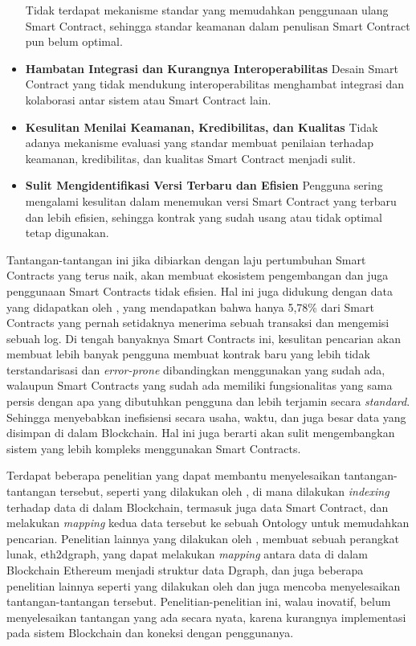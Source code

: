 \begin{itemize}
	      Tidak terdapat mekanisme standar yang memudahkan penggunaan ulang Smart Contract, sehingga standar keamanan dalam penulisan Smart Contract pun belum optimal.
	\item \textbf{Hambatan Integrasi dan Kurangnya Interoperabilitas} \newline
	      Desain Smart Contract yang tidak mendukung interoperabilitas menghambat integrasi dan kolaborasi antar sistem atau Smart Contract lain.
	\item \textbf{Kesulitan Menilai Keamanan, Kredibilitas, dan Kualitas} \newline
	      Tidak adanya mekanisme evaluasi yang standar membuat penilaian terhadap keamanan, kredibilitas, dan kualitas Smart Contract menjadi sulit.
	\item \textbf{Sulit Mengidentifikasi Versi Terbaru dan Efisien} \newline
	      Pengguna sering mengalami kesulitan dalam menemukan versi Smart Contract yang terbaru dan lebih efisien, sehingga kontrak yang sudah usang atau tidak optimal tetap digunakan.
\end{itemize}

Tantangan-tantangan ini jika dibiarkan dengan laju pertumbuhan Smart Contracts yang terus naik, akan membuat ekosistem pengembangan dan juga penggunaan Smart Contracts tidak efisien. Hal ini juga didukung dengan data yang didapatkan oleh \cite{aimar2023extraction}, yang mendapatkan bahwa hanya 5,78\% dari Smart Contracts yang pernah setidaknya menerima sebuah transaksi dan mengemisi sebuah log. Di tengah banyaknya Smart Contracts ini, kesulitan pencarian akan membuat lebih banyak pengguna membuat kontrak baru yang lebih tidak terstandarisasi dan \textit{error-prone} dibandingkan menggunakan yang sudah ada, walaupun Smart Contracts yang sudah ada memiliki fungsionalitas yang sama persis dengan apa yang dibutuhkan pengguna dan lebih terjamin secara \textit{standard}. Sehingga menyebabkan inefisiensi secara usaha, waktu, dan juga besar data yang disimpan di dalam Blockchain. Hal ini juga berarti akan sulit mengembangkan sistem yang lebih kompleks menggunakan Smart Contracts.

Terdapat beberapa penelitian yang dapat membantu menyelesaikan tantangan-tantangan tersebut, seperti yang dilakukan oleh \cite{third2017linked}, di mana dilakukan \textit{indexing} terhadap data di dalam Blockchain, termasuk juga data Smart Contract, dan melakukan \textit{mapping} kedua data tersebut ke sebuah Ontology untuk memudahkan pencarian. Penelitian lainnya yang dilakukan oleh \cite{aimar2023extraction}, membuat sebuah perangkat lunak, eth2dgraph, yang dapat melakukan \textit{mapping} antara data di dalam Blockchain Ethereum menjadi struktur data Dgraph, dan juga beberapa penelitian lainnya seperti yang dilakukan oleh \cite{baqa2019semantic} dan \cite{cano2021toward} juga mencoba menyelesaikan tantangan-tantangan tersebut. Penelitian-penelitian ini, walau inovatif, belum menyelesaikan tantangan yang ada secara nyata, karena kurangnya implementasi pada sistem Blockchain dan koneksi dengan penggunanya.

